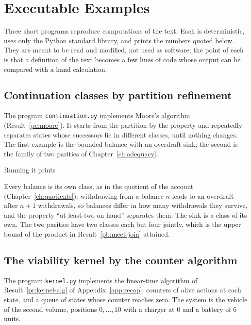 \chapter{Executable Examples}\label{app:examples}

Three short programs reproduce computations of the text. Each is deterministic, uses only the Python standard library, and prints the numbers quoted below. They are meant to be read and modified, not used as software; the point of each is that a definition of the text becomes a few lines of code whose output can be compared with a hand calculation.

\section{Continuation classes by partition refinement}

The program \texttt{continuation.py} implements Moore's algorithm (Result~\ref{pc:moore}). It starts from the partition by the property and repeatedly separates states whose successors lie in different classes, until nothing changes. The first example is the bounded balance with an overdraft sink; the second is the family of two parities of Chapter~\ref{ch:adequacy}.



Running it prints



Every balance is its own class, as in the quotient of the account (Chapter~\ref{ch:quotients}): withdrawing from a balance $n$ leads to an overdraft after $n+1$ withdrawals, so balances differ in how many withdrawals they survive, and the property ``at least two on hand'' separates them. The sink is a class of its own. The two parities have two classes each but four jointly, which is the upper bound of the product in Result~\ref{pb:meet-join} attained.

\section{The viability kernel by the counter algorithm}

The program \texttt{kernel.py} implements the linear-time algorithm of Result~\ref{pr:kernel-alg} of Appendix~\ref{app:recap}: counters of alive actions at each state, and a queue of states whose counter reaches zero. The system is the vehicle of the second volume, positions $0,\dots,10$ with a charger at $0$ and a battery of $6$ units.

